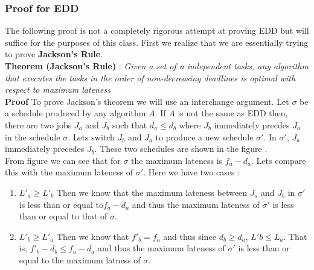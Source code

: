\documentclass{hw}
\begin{document}
\subsubsection{Proof for EDD}
The following proof is not a completely rigorous attempt at proving EDD but
will suffice for the purposes of this class. First we realize that we are
essentially trying to prove \textbf{Jackson's Rule}. \\

\textbf{Theorem (Jackson's Rule)} : \textit{Given a set of n independent tasks,
any algorithm that executes the tasks in the order of non-decreasing deadlines
is optimal with respect to maximum lateness} \\

\textbf{Proof} To prove Jackson's theorem we will use an interchange argument.
Let $\sigma$ be a schedule produced by any algorithm $A$. If $A$ is not the
same as EDD then, there are two jobs $J_a$ and $J_b$ such that $d_a \leq d_b$
where $J_b$ immediately precdes $J_a$ in the schedule $\sigma$. Lets switch
$J_b$ and $J_a$ to produce a new schedule $\sigma '$. In $\sigma '$, $J_a$
immediately precedes $J_b$. These two schedules are shown in the figure
. \\

From figure  we can see that for $\sigma$ the maximum lateness is
$f_a - d_a$. Lets compare this with the maximum lateness of $\sigma '$. Here we
have two cases :

\begin{enumerate}
  \item $L'_a \geq L'_b$ Then we know that the maximum lateness between $J_a$
    and $J_b$ in $\sigma '$ is less than or equal to$f_a - d_a$ and thus the
    maximum lateness of $\sigma '$ is less than or equal to that of $\sigma$.
  \item $L'_b \geq L'_a$ Then we know that $f'_b = f_a$ and thus since $d_b
    \geq d_a$, $L'b \leq L_a$. That is, $f'_b - d_b \leq f_a - d_a$ and thus
    the maximum lateness of $\sigma '$ is less than or equal to the maximum
    latness of $\sigma$.
\end{enumerate}
\end{document}

